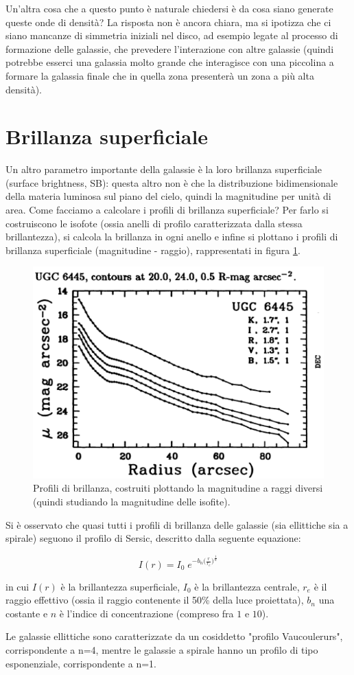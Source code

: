 Un'altra cosa che a questo punto è naturale chiedersi è da cosa siano generate queste onde di densità? La risposta non è ancora chiara, ma si ipotizza che ci siano mancanze di simmetria iniziali nel disco, ad esempio legate al processo di formazione delle galassie, che prevedere l’interazione con altre galassie (quindi potrebbe esserci una galassia molto grande che interagisce con una piccolina a formare la galassia finale che in quella zona presenterà un zona a più alta densità).

\section{Brillanza superficiale}
Un altro parametro importante della galassie è la loro brillanza superficiale (surface brightness, SB): questa altro non è che la distribuzione bidimensionale della materia luminosa sul piano del cielo, quindi la magnitudine per unità di area. Come facciamo a calcolare i profili di brillanza superficiale? Per farlo si costruiscono le isofote (ossia anelli di profilo caratterizzata dalla stessa brillantezza), si calcola la brillanza in ogni anello e infine si plottano i profili di brillanza superficiale (magnitudine - raggio), rappresentati in figura \ref{fig:profili-brillanza}.

\begin{figure}
    \centering
    \includegraphics[width = 0.5 \textwidth]{immagini/profili-di-brillanza.png}
    \caption{Profili di brillanza, costruiti plottando la magnitudine a raggi diversi (quindi studiando la magnitudine delle isofite).}
    \label{fig:profili-brillanza}
\end{figure}

Si è osservato che quasi tutti i profili di brillanza delle galassie (sia ellittiche sia a spirale) seguono il profilo di Sersic, descritto dalla seguente equazione:

\begin{equation*}
    I(r) = I_0 \; e^{-b_n \big(\frac{r}{r_e}\big)^\frac{1}{n}}
\end{equation*}

in cui $I(r)$ è la brillantezza superficiale, $I_0$ è la brillantezza centrale, $r_e$ è il raggio effettivo (ossia il raggio contenente il 50\% della luce proiettata), $b_n$ una costante e $n$ è l'indice di concentrazione (compreso fra $1$ e $10$).

Le galassie ellittiche sono caratterizzate da un cosiddetto "profilo Vaucoulerurs", corrispondente a n=4, mentre le galassie a spirale hanno un profilo di tipo esponenziale, corrispondente a n=1. 